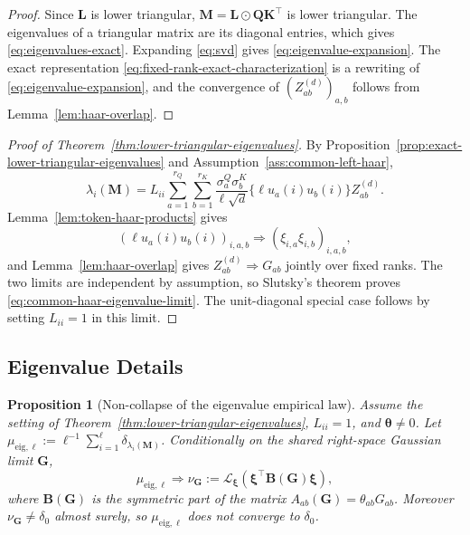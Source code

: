 \documentclass{article}
\newcommand{\weak}{\Rightarrow}
\newcommand{\hadamard}{\mathbin{\odot}}
\newcommand{\bB}{\mathbf{B}}
\newcommand{\bM}{\mathbf{M}}
\newcommand{\bL}{\mathbf{L}}
\newcommand{\bQ}{\mathbf{Q}}
\newcommand{\bK}{\mathbf{K}}
\newcommand{\bG}{\mathbf{G}}
\newtheorem{proposition}[theorem]{Proposition}
\theoremstyle{remark}
\begin{document}
\begin{proof}
Since $\bL$ is lower triangular, $\bM=\bL\hadamard\bQ\bK^\top$ is lower
triangular.  The eigenvalues of a triangular matrix are its diagonal entries,
which gives \eqref{eq:eigenvalues-exact}.  Expanding \eqref{eq:svd} gives
\eqref{eq:eigenvalue-expansion}.  The exact representation
\eqref{eq:fixed-rank-exact-characterization} is a rewriting of
\eqref{eq:eigenvalue-expansion}, and the convergence of
$(Z_{ab}^{(d)})_{a,b}$ follows from Lemma~\ref{lem:haar-overlap}.
\end{proof}

\begin{proof}[Proof of Theorem~\ref{thm:lower-triangular-eigenvalues}]
By Proposition~\ref{prop:exact-lower-triangular-eigenvalues} and
Assumption~\ref{ass:common-left-haar},
\[
    \lambda_i(\bM)
    =
    L_{ii}\sum_{a=1}^{r_Q}\sum_{b=1}^{r_K}
    \frac{\sigma^Q_a\sigma^K_b}{\ell\sqrt d}
    \{\ell u_a(i)u_b(i)\}
    Z_{ab}^{(d)}.
\]
Lemma~\ref{lem:token-haar-products} gives
\[
\left(\ell u_a(i)u_b(i)\right)_{i,a,b}
\weak
\left(\xi_{i,a}\xi_{i,b}\right)_{i,a,b},
\]
and Lemma~\ref{lem:haar-overlap} gives
$Z_{ab}^{(d)}\weak G_{ab}$ jointly over fixed ranks.  The two limits are
independent by assumption, so Slutsky's theorem proves
\eqref{eq:common-haar-eigenvalue-limit}.  The unit-diagonal special case follows
by setting $L_{ii}=1$ in this limit.
\end{proof}

\subsection{Eigenvalue Details}
\label{app:eigenvalue-details}

\begin{proposition}[Non-collapse of the eigenvalue empirical law]
Assume the setting of Theorem~\ref{thm:lower-triangular-eigenvalues},
$L_{ii}=1$, and $\boldsymbol{\theta}\neq0$.  Let
$\mu_{\mathrm{eig},\ell}:=\ell^{-1}\sum_{i=1}^{\ell}
\delta_{\lambda_i(\bM)}$.  Conditionally on the shared right-space Gaussian
limit $\bG$,
\begin{equation}
    \mu_{\mathrm{eig},\ell}
    \weak
    \nu_{\bG}
    :=
    \mathcal L_{\boldsymbol{\xi}}
    \left(
    \boldsymbol{\xi}^\top\bB(\bG)\boldsymbol{\xi}
    \right),
    \label{eq:noncollapsed-esd-limit}
\end{equation}
where $\bB(\bG)$ is the symmetric part of the matrix
$A_{ab}(\bG)=\theta_{ab}G_{ab}$.  Moreover
$\nu_{\bG}\neq\delta_0$ almost surely, so
$\mu_{\mathrm{eig},\ell}$ does not converge to $\delta_0$.
\label{prop:eigenvalue-esd-noncollapse}
\end{proposition}
\end{document}
